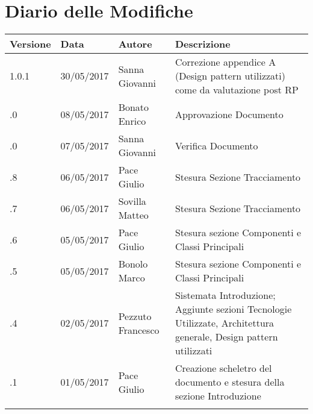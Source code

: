 \section*{Diario delle Modifiche}
\begin{longtabu} to \textwidth {
	X[4,l,p]
	X[4,l,p]
	X[4,l,p]
	X[8,l,p]}
	\toprule
		 Versione & Data & Autore & Descrizione \\
		\midrule
		\endhead
		1.0.1 & 30/05/2017 & Sanna Giovanni & Correzione appendice A (Design pattern utilizzati) come da valutazione post RP\\
		\addlinespace[0.2em]
		\midrule
		.0 & 08/05/2017 & Bonato Enrico & Approvazione Documento\\
		\addlinespace[0.2em]
		\midrule
		.0 & 07/05/2017 & Sanna Giovanni & Verifica Documento\\
		\addlinespace[0.2em]
		\midrule
		.8 & 06/05/2017 & Pace Giulio & Stesura Sezione Tracciamento\\
		\addlinespace[0.2em]
		\midrule
		.7 & 06/05/2017 & Sovilla Matteo & Stesura Sezione Tracciamento\\
		\addlinespace[0.2em]
		\midrule
		.6 & 05/05/2017 & Pace Giulio & Stesura sezione Componenti e Classi Principali\\
		\addlinespace[0.2em]
		\midrule
		.5 & 05/05/2017 & Bonolo Marco & Stesura sezione Componenti e Classi Principali\\
		\addlinespace[0.2em]
		\midrule
		.4 & 02/05/2017 & Pezzuto Francesco & Sistemata Introduzione; Aggiunte sezioni Tecnologie Utilizzate, Architettura generale, Design pattern utilizzati\\
		\addlinespace[0.2em]
		\midrule
		.1 & 01/05/2017 & Pace Giulio & Creazione scheletro del documento e stesura della sezione Introduzione\\
		\addlinespace[0.4em]
		
	\bottomrule
\end{longtabu}
